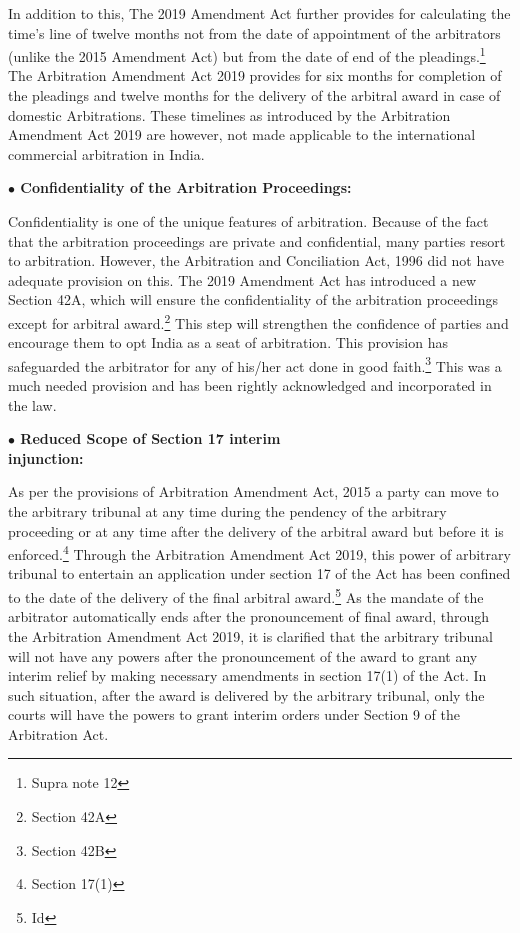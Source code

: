 \begin{multicols}{2}
\noi
In addition to this, The 2019 Amendment Act further provides for calculating the time's line
of twelve months not from the date of appointment of the arbitrators (unlike the 2015
Amendment Act) but from the date of end of the pleadings.\footnote{Supra note 12} The Arbitration Amendment
Act 2019 provides for six months for completion of the pleadings and twelve months for the
delivery of the arbitral award in case of domestic Arbitrations. These timelines as introduced
by the Arbitration Amendment Act 2019 are however, not made applicable to the
international commercial arbitration in India.

\noi
{\large \bfseries $\bullet$ Confidentiality of the Arbitration Proceedings:}

\noi
Confidentiality is one of the unique features of arbitration. Because of the fact that the
arbitration proceedings are private and confidential, many parties resort to arbitration.
However, the Arbitration and Conciliation Act, 1996 did not have adequate provision on this.
The 2019 Amendment Act has introduced a new Section 42A, which will ensure the
confidentiality of the arbitration proceedings except for arbitral award.\footnote{Section 42A} This step will
strengthen the confidence of parties and encourage them to opt India as a seat of arbitration.
This provision has safeguarded the arbitrator for any of his/her act done in good faith.\footnote{Section 42B} This
was a much needed provision and has been rightly acknowledged and incorporated in the
law.

\noi
{\large \bfseries $\bullet$ Reduced Scope of Section 17 interim\\ injunction:}

\noi
As per the provisions of Arbitration Amendment Act, 2015 a party can move to the arbitrary
tribunal at any time during the pendency of the arbitrary proceeding or at any time after the
delivery of the arbitral award but before it is enforced.\footnote{Section 17(1)} Through the Arbitration Amendment
Act 2019, this power of arbitrary tribunal to entertain an application under section 17 of the
Act has been confined to the date of the delivery of the final arbitral award.\footnote{Id} As the mandate
of the arbitrator automatically ends after the pronouncement of final award, through the 
Arbitration Amendment Act 2019, it is clarified that the arbitrary tribunal will not have any
powers after the pronouncement of the award to grant any interim relief by making necessary
amendments in section 17(1) of the Act. In such situation, after the award is delivered by the
arbitrary tribunal, only the courts will have the powers to grant interim orders under Section 9
of the Arbitration Act.


\end{multicols}
